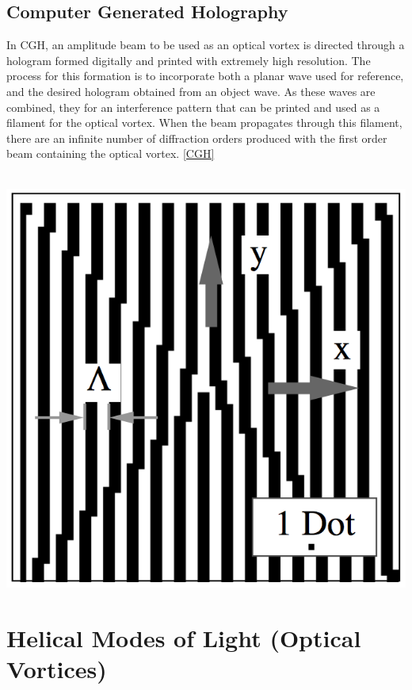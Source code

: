 \documentclass[10pt]{article}
\newcommand{\psl}{6pt} %
\begin{document}
\subsection*{Computer Generated Holography}
In CGH, an amplitude beam to be used as an optical vortex is directed through a hologram formed digitally and printed with extremely high resolution. The process for this formation is to incorporate both a planar wave used for reference, and the desired hologram obtained from an object wave. As these waves are combined, they for an interference pattern that can be printed and used as a filament for the optical vortex. When the beam propagates through this filament, there are an infinite number of diffraction orders produced with the first order beam containing the optical vortex. \ref{CGH}
\\\\\begin{center}
\includegraphics[scale=.3]{CGH.jpg}
\end{center}





\titlespacing{\section}{0pt}{\psl}{0pt}
\section*{Helical Modes of Light (Optical Vortices)}
\end{document}
